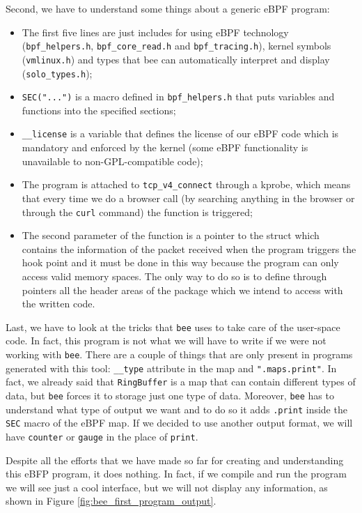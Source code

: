 Second, we have to understand some things about a generic eBPF program:

\begin{itemize}
	\item The first five lines are just includes for using eBPF technology
		(\verb|bpf_helpers.h|, \verb|bpf_core_read.h| and \verb|bpf_tracing.h|), kernel symbols (\verb|vmlinux.h|) and types that bee can automatically interpret and display (\verb|solo_types.h|);
	\item \verb|SEC("...")| is a macro defined in \verb|bpf_helpers.h| that puts
		variables and functions into the specified sections;
	\item \verb|__license| is a variable that defines the license of our eBPF code
		which is mandatory and enforced by the kernel (some eBPF functionality is unavailable to non-GPL-compatible code);
	\item The program is attached to \verb|tcp_v4_connect| through a kprobe, which
		means that every time we do a browser call (by searching anything in the browser or through the \verb|curl| command) the function is triggered;
	\item The second parameter of the function is a pointer to the struct which
		contains the information of the packet received when the program triggers the hook point and it must be done in this way because the program can only access valid memory spaces.
		The only way to do so is to define through pointers all the header areas of the package which we intend to access with the written code.
\end{itemize}

Last, we have to look at the tricks that \verb|bee| uses to take care of the user-space code.
In fact, this program is not what we will have to write if we were not working with \verb|bee|.
There are a couple of things that are only present in programs generated with this tool: \verb|__type| attribute in the map and \verb|".maps.print"|.
In fact, we already said that \verb|RingBuffer| is a map that can contain different types of data, but \verb|bee| forces it to storage just one type of data.
Moreover, \verb|bee| has to understand what type of output we want and to do so it adds \verb|.print| inside the \verb|SEC| macro of the eBPF map.
If we decided to use another output format, we will have \verb|counter| or \verb|gauge| in the place of \verb|print|.

Despite all the efforts that we have made so far for creating and understanding this eBFP program, it does nothing.
In fact, if we compile and run the program we will see just a cool interface, but we will not display any information, as shown in Figure \ref{fig:bee_first_program_output}.

